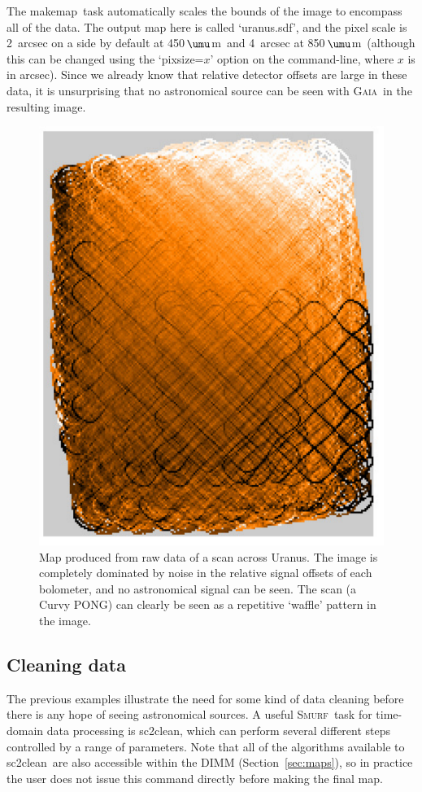 \documentclass[twoside,11pt]{article}
\newcommand{\micron}{\mbox{\,${\umu}$m}}            %
\newcommand{\xref}[3]{#1}
\newcommand{\xlabel}[1]{}
\renewcommand{\_}{\texttt{\symbol{95}}}
\newcommand{\gaia}{\xref{\textsc{Gaia}}{sun214}{}}
\newcommand{\smurf}{\xref{\textsc{Smurf}}{sun258}{}}
\newcommand{\task}[1]{\textsf{#1}}
\newcommand{\clean}{\xref{\task{sc2clean}}{sun258}{SC2CLEAN}}
\newcommand{\makemap}{\xref{\task{makemap}}{sun258}{MAKEMAP}}
\begin{document}
The \makemap\ task automatically scales the bounds of the image to
encompass all of the data. The output map here is called `uranus.sdf',
and the pixel scale is 2~arcsec on a side by default at
450\micron\ and 4~arcsec at 850\micron\ (although this can be
changed using the `pixsize=$x$' option on the command-line, where $x$
is in arcsec). Since we already know that relative detector offsets
are large in these data, it is unsurprising that no astronomical
source can be seen with \gaia\ in the resulting image.

\begin{figure}
\begin{center}
\includegraphics[width=0.5\linewidth]{sc19_rawmap}
\caption{Map produced from raw data of a scan across Uranus. The
  image is completely dominated by noise in the relative signal
  offsets of each bolometer, and no astronomical signal can be
  seen. The scan (a Curvy PONG) can clearly be seen as a repetitive
  `waffle' pattern in the image.}
\label{fig:rawmap}
\end{center}
\end{figure}

\subsection{\xlabel{clean}Cleaning data}

The previous examples illustrate the need for some kind of data
cleaning before there is any hope of seeing astronomical sources. A
useful \smurf\ task for time-domain data processing is \clean, which
can perform several different steps controlled by a range of
parameters. Note that all of the algorithms available to \clean\ are
also accessible within the DIMM (Section~\ref{sec:maps}), so in
practice the user does not issue this command directly before making
the final map.
\end{document}
